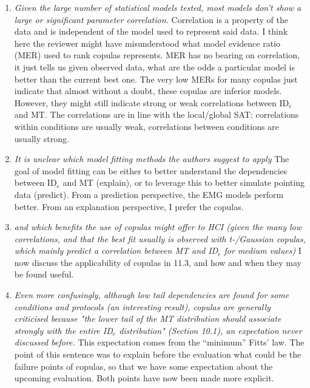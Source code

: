 \documentclass{article}
\begin{document}
\begin{enumerate}
    \item \textit{Given the large number of statistical models tested, most models don't show a large or significant parameter correlation.} Correlation is a property of the data and is independent of the model used to represent said data. I think here the reviewer might have misunderstood what model evidence ratio (MER) used to rank copulas represents. MER has no bearing on correlation, it just tells us given observed data, what are the odds a particular model is better than the current best one. The very low MERs for many copulas just indicate that almost without a doubt, these copulas are inferior models. However, they might still indicate strong or weak correlations between ID$_e$ and MT. The correlations are in line with the local/global SAT: correlations within conditions are usually weak, correlations between conditions are usually strong.
    \item \textit{It is unclear which model fitting methods the authors suggest to apply} The goal of model fitting can be either to better understand the dependencies between ID$_e$ and MT (explain), or to leverage this to better simulate pointing data (predict). From a prediction perspective, the EMG models perform better. From an explanation perspective, I prefer the copulas. 
    \item \textit{and which benefits the use of copulas might offer to HCI (given the many low correlations, and that the best fit usually is observed with t-/Gaussian copulas, which mainly predict a correlation between MT and ID$_e$ for medium values)} I now discuss the applicability of copulas in 11.3, and how and when they may be found useful. %
    \item \textit{Even more confusingly, although low tail dependencies are found for some conditions and protocols (an interesting result), copulas are generally criticised because "the lower tail of the MT distribution should associate strongly with the entire ID$_e$ distribution" (Section 10.1), an expectation never discussed before.} This expectation comes from the ``minimum'' Fitts' law. The point of this sentence was to explain before the evaluation what could be the failure points of copulas, so that we have some expectation about the upcoming evaluation. Both points have now been made more explicit.

\end{enumerate}
\end{document}
